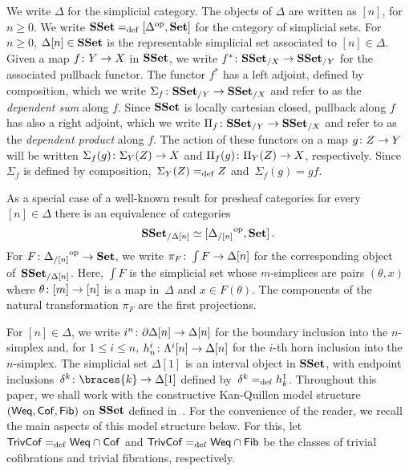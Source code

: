 \documentclass[reqno,10pt,a4paper,oneside,draft]{amsart}
\begin{document}
We write $\Delta$ for the simplicial category. The objects of $\Delta$ are written as $[n]$, for $n \geq 0$.
We write $\mathbf{SSet} =_{\operatorname{def}} [\Delta^{\operatorname{op}}, \mathbf{Set}]$ for the category of simplicial sets. For $n \geq 0$, $\Delta[n] \in \mathbf{SSet}$ is the representable simplicial set associated to $[n] \in \Delta$. Given a map $f \colon Y \to X$ in $\mathbf{SSet}$, we write $f^* \colon \mathbf{SSet}_{/X} \to \mathbf{SSet}_{/Y}$
for the associated pullback functor. The functor $f^*$ has a left adjoint, defined
by composition, which we write $\Sigma_{f} \colon \mathbf{SSet}_{/Y} \to \mathbf{SSet}_{/X}$ and refer
to as the \emph{dependent sum} along $f$. Since $\mathbf{SSet}$ is locally cartesian closed, pullback
along $f$ has also a right adjoint, which we write 
$\Pi_f \colon \mathbf{SSet}_{/Y} \to \mathbf{SSet}_{/X}$ and refer to as the \emph{dependent
product}  along $f$. The action of these functors on a
map $g \colon Z \to Y$ will be written $\Sigma_f(g) \colon \Sigma_Y(Z) \to X$ and 
$\Pi_f(g) \colon \Pi_Y(Z) \to X$, respectively. Since  $\Sigma_f$ is defined by composition,~$\Sigma_Y(Z) =_{\operatorname{def}} Z$ and~$\Sigma_f(g) = g f $. 

As a special case of a well-known result for presheaf 
categories for every~$[n] \in \Delta$ there is an equivalence of categories
\begin{equation}
\label{equ:psh-slice-sset}
\mathbf{SSet}_{/\Delta[n]} \simeq  [ {\Delta_{/[n]}}^{\operatorname{op}}, \mathbf{Set}]   \, .
\end{equation}
For $F \colon {\Delta_{/[n]}}^{\operatorname{op}} \to \mathbf{Set}$, we write $\pi_F \colon \int F \to \Delta[n]$
for the corresponding object of~$\mathbf{SSet}_{/ \Delta[n]}$. Here, $\int F$ is the
simplicial set whose $m$-simplices are pairs $(\theta, x)$ where $\theta \colon [m] \to [n]$
is a map in~$\Delta$ and $x \in F(\theta)$. The components of the natural
transformation $\pi_F$ are the first projections.




For $[n] \in \Delta$, we write $i^n \colon  \partial \Delta[n] \to \Delta[n]$ for the boundary inclusion into the $n$-simplex and, for $1 \leq i \leq n$,  
$h^i_n  \colon \Lambda^i[n] \to \Delta[n]$  for the $i$-th horn inclusion into the $n$-simplex. The simplicial set $\Delta[1]$ is an interval object in $\mathbf{SSet}$, with endpoint inclusions~$\kcyl \co \braces{ k} \to \Delta[1]$ defined by~$\delta^k =_{\operatorname{def}} h^1_k$. Throughout this paper, we shall work  with the constructive 
Kan-Quillen model structure $(\mathsf{Weq}, \mathsf{Cof}, \mathsf{Fib})$ on $\mathbf{SSet}$ defined in~\cite{henry2019qms}. 
For the convenience of the reader, we recall the main aspects of this model structure below.
For this, let $\mathsf{TrivCof} =_{\operatorname{def}} \mathsf{Weq} \cap \mathsf{Cof}$ and $\mathsf{TrivCof} =_{\operatorname{def}} \mathsf{Weq} \cap \mathsf{Fib}$ be the classes of trivial cofibrations and trivial fibrations,
respectively. 
\end{document}

